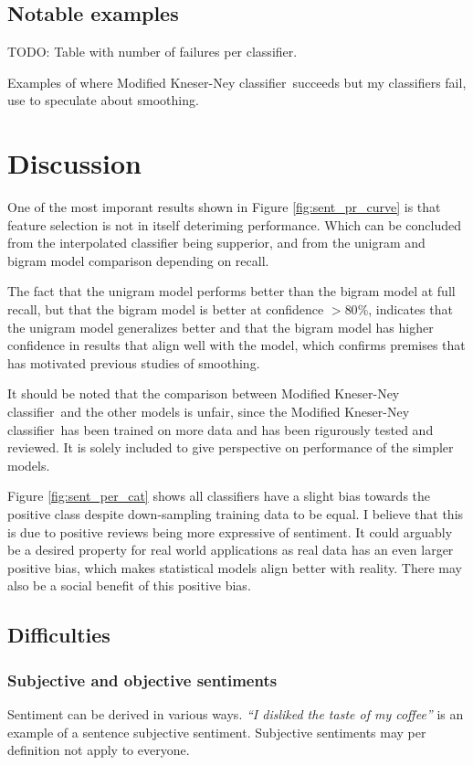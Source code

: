 \documentclass[a4paper,11pt]{kth-mag}
\newcommand{\ysc}{Modified Kneser-Ney classifier}
\begin{document}
\subsection{Notable examples}
TODO: Table with number of failures per classifier.

Examples of where \ysc~succeeds but my classifiers fail, use to speculate about smoothing.


\newpage
\section{Discussion}

One of the most imporant results shown in Figure \ref{fig:sent_pr_curve} is that feature selection is not in itself deteriming performance.  Which can be concluded from the interpolated classifier being supperior, and from the unigram and bigram model comparison depending on recall.

The fact that the unigram model performs better than the bigram model at full recall, but that the bigram model is better at confidence $>80\%$, indicates that the unigram model generalizes better and that the bigram model has higher confidence in results that align well with the model, which confirms premises that has motivated previous studies of smoothing.

It should be noted that the comparison between \ysc~and the other models is unfair, since the \ysc~has been trained on more data and has been rigurously tested and reviewed. It is solely included to give perspective on performance of the simpler models.

Figure \ref{fig:sent_per_cat} shows all classifiers have a slight bias towards the positive class despite down-sampling training data to be equal. I believe that this is due to positive reviews being more expressive of sentiment. It could arguably be a desired property for real world applications as real data has an even larger positive bias, which makes statistical models align better with reality. There may also be a social benefit of this positive bias.





\subsection{Difficulties}
\subsubsection{Subjective and objective sentiments}
Sentiment can be derived in various ways. \emph{``I disliked the taste of my coffee''} is an example of a sentence subjective sentiment. Subjective sentiments may per definition not apply to everyone.
\end{document}
